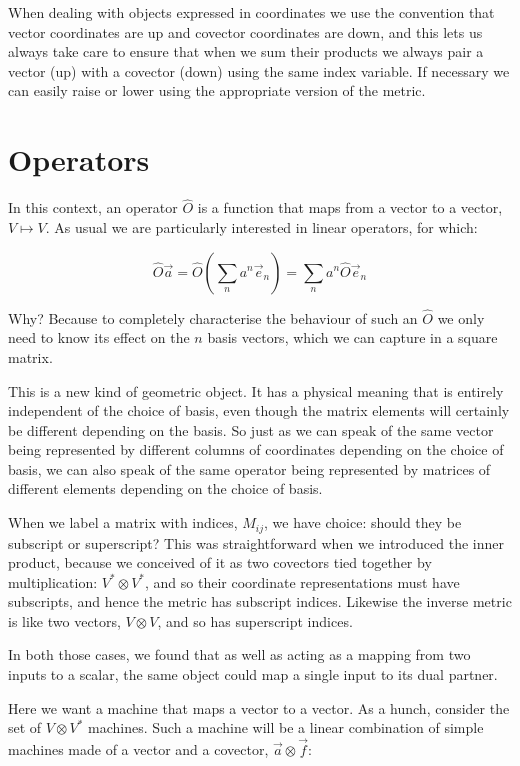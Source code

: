 When dealing with objects expressed in coordinates we use the convention that vector coordinates are up and covector coordinates are down, and this lets us always take care to ensure that when we sum their products we always pair a vector (up) with a covector (down) using the same index variable. If necessary we can easily raise or lower using the appropriate version of the metric.

\section{Operators}

In this context, an operator $\hat{O}$ is a function that maps from a vector to a vector, $V \mapsto V$. As usual we are particularly interested in linear operators, for which:

$$
\hat{O} \vec{a}
=
\hat{O}\left(\sum_n a^n\vec{e}_n \right)
= 
\sum_n a^n\hat{O}\vec{e}_n
$$

Why? Because to completely characterise the behaviour of such an $\hat{O}$ we only need to know its effect on the $n$ basis vectors, which we can capture in a square matrix.

This is a new kind of geometric object. It has a physical meaning that is entirely independent of the choice of basis, even though the matrix elements will certainly be different depending on the basis. So just as we can speak of the same vector being represented by different columns of coordinates depending on the choice of basis, we can also speak of the same operator being represented by matrices of different elements depending on the choice of basis.

When we label a matrix with indices, $M_{ij}$, we have choice: should they be subscript or superscript? This was straightforward when we introduced the inner product, because we conceived of it as two covectors tied together by multiplication: $V^* \otimes V^*$, and so their coordinate representations must have subscripts, and hence the metric has subscript indices. Likewise the inverse metric is like two vectors, $V \otimes V$, and so has superscript indices.

In both those cases, we found that as well as acting as a mapping from two inputs to a scalar, the same object could map a single input to its dual partner.

Here we want a machine that maps a vector to a vector. As a hunch, consider the set of $V \otimes V^*$ machines. Such a machine will be a linear combination of simple machines made of a vector and a covector, $\vec{a} \otimes \vec{f}$:

